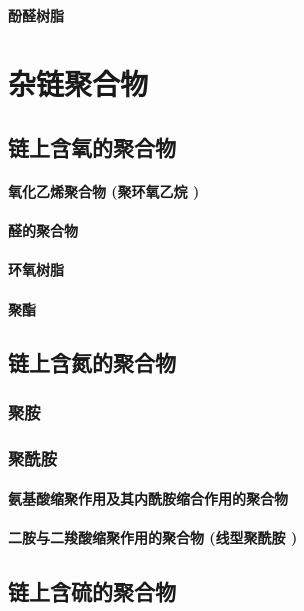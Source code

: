 \documentclass[UTF8]{../03-Chemistry}
\begin{document}
    \subsubsection{酚醛树脂}







\chapter{杂链聚合物}
\section{链上含氧的聚合物}
    \subsubsection{氧化乙烯聚合物 (聚环氧乙烷 )}
    \subsubsection{醛的聚合物}
    \subsubsection{环氧树脂}
    \subsubsection{聚酯}
\section{链上含氮的聚合物}
    \subsection{聚胺}
    \subsection{聚酰胺}
        \subsubsection{氨基酸缩聚作用及其内酰胺缩合作用的聚合物}
        \subsubsection{二胺与二羧酸缩聚作用的聚合物 (线型聚酰胺 )}
\section{链上含硫的聚合物}
\end{document}
